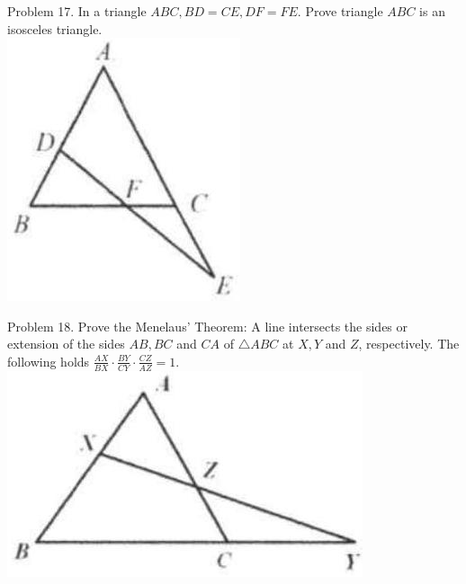 \documentclass[10pt]{article}
\begin{document}
Problem 17. In a triangle \(A B C, B D=C E, D F=F E\). Prove triangle \(A B C\) is an isosceles triangle.\\
\includegraphics[max width=\textwidth, center]{2025_04_17_97bc1f7e44d93c271a88g-091(1)}

Problem 18. Prove the Menelaus' Theorem: A line intersects the sides or extension of the sides \(A B, B C\) and \(C A\) of \(\triangle A B C\) at \(X, Y\) and \(Z\), respectively. The following holds \(\frac{A X}{B X} \cdot \frac{B Y}{C Y} \cdot \frac{C Z}{A Z}=1\).\\
\includegraphics[max width=\textwidth, center]{2025_04_17_97bc1f7e44d93c271a88g-091}
\end{document}
